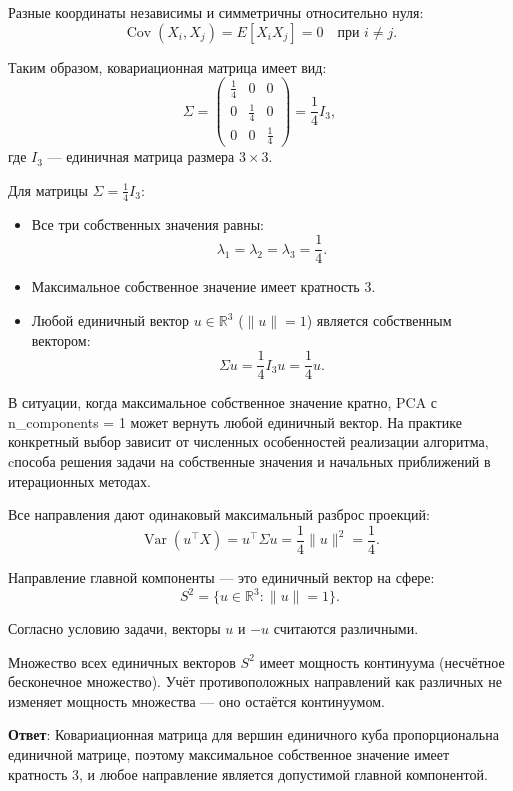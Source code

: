 \documentclass[pract]{SCWorks}
\begin{document}
    Разные координаты независимы и симметричны относительно нуля:
    \[
    \operatorname{Cov}(X_i, X_j) = E[X_i X_j] = 0 \quad \text{при } i \neq j.
    \]

    Таким образом, ковариационная матрица имеет вид:
    \[
    \Sigma =
    \begin{pmatrix}
    \frac{1}{4} & 0 & 0 \\
    0 & \frac{1}{4} & 0 \\
    0 & 0 & \frac{1}{4}
    \end{pmatrix}
    = \frac{1}{4} I_3,
    \label{eq:covariance_matrix}
    \]
    где $I_3$ — единичная матрица размера $3\times 3$.

    Для матрицы $\Sigma = \frac{1}{4} I_3$:
    \begin{itemize}
        \item[$\bullet$] Все три собственных значения равны:
        \[
        \lambda_1 = \lambda_2 = \lambda_3 = \frac{1}{4}.
        \]
        \item[$\bullet$] Максимальное собственное значение имеет кратность 3.
        \item[$\bullet$] Любой единичный вектор $u \in \mathbb{R}^3$ ($\|u\| = 1$) является собственным вектором:
        \[
        \Sigma u = \frac{1}{4} I_3 u = \frac{1}{4} u.
        \]
    \end{itemize}

    В ситуации, когда максимальное собственное значение кратно, PCA с n\_components = 1 может вернуть любой единичный вектор.
    На практике конкретный выбор зависит от численных особенностей реализации алгоритма, cпособа решения задачи на собственные значения и начальных приближений в итерационных методах.

    Все направления дают одинаковый максимальный разброс проекций:
    \[
    \operatorname{Var}(u^{\top}X) = u^{\top}\Sigma u = \frac{1}{4} \|u\|^2 = \frac{1}{4}.
    \]

    Направление главной компоненты — это единичный вектор на сфере:
    \[
    S^2 = \{u \in \mathbb{R}^3 : \|u\| = 1\}.
    \]

    Согласно условию задачи, векторы $u$ и $-u$ считаются различными.

    Множество всех единичных векторов $S^2$ имеет мощность континуума (несчётное бесконечное множество).
    Учёт противоположных направлений как различных не изменяет мощность множества — оно остаётся континуумом.

    \textbf{Ответ}: Ковариационная матрица для вершин единичного куба пропорциональна единичной матрице, поэтому максимальное собственное значение имеет кратность 3, и любое направление является допустимой главной компонентой.
\end{document}
